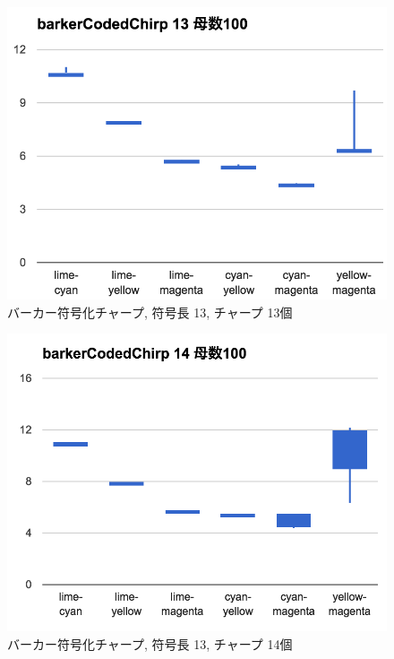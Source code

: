 \begin{figure}[p]
  \centering
  \includegraphics[clip,width=1.05\hsize]{img/bcc13.png}
  \caption{バーカー符号化チャープ, 符号長 13, チャープ 13個}\label{fig:bcc13}
\end{figure}

\begin{figure}[p]
  \centering
  \includegraphics[clip,width=1.05\hsize]{img/bcc14.png}
  \caption{バーカー符号化チャープ, 符号長 13, チャープ 14個}\label{fig:bcc14}
\end{figure}

